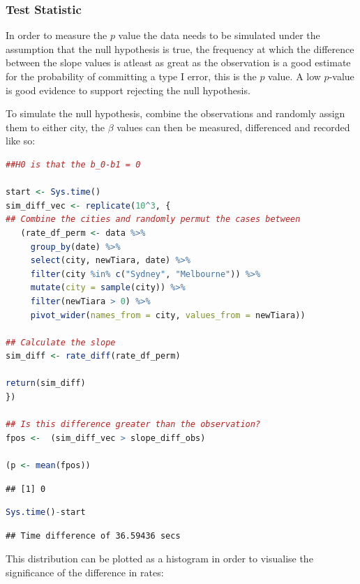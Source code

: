 \documentclass{article}
\begin{document}
\hypertarget{test-statistic-1}{%
\subsubsection{Test Statistic}\label{test-statistic-1}}

In order to measure the \(p\) value the data needs to be simulated under
the assumption that the null hypothesis is true, the frequency at which
the difference between the slope values is atleast as great as the
observation is a good estimate for the probability of committing a type
I error, this is the \(p\) value. A low \(p\)-value is good evidence to
support rejecting the null hypothesis.

To simulate the null hypothesis, combine the observations and randomly
assign them to either city, the \(\beta\) values can then be measured,
differenced and recorded like so:

\begin{lstlisting}[language=R]
##H0 is that the b_0-b1 = 0

start <- Sys.time()
sim_diff_vec <- replicate(10^3, {
## Combine the cities and randomly permut the cases between
   (rate_df_perm <- data %>% 
     group_by(date) %>% 
     select(city, newTiara, date) %>% 
     filter(city %in% c("Sydney", "Melbourne")) %>% 
     mutate(city = sample(city)) %>% 
     filter(newTiara > 0) %>% 
     pivot_wider(names_from = city, values_from = newTiara))
  
## Calculate the slope
sim_diff <- rate_diff(rate_df_perm)

return(sim_diff)
}) 

## Is this difference greater than the observation?
fpos <-  (sim_diff_vec > slope_diff_obs)

(p <- mean(fpos))
\end{lstlisting}

\begin{lstlisting}
## [1] 0
\end{lstlisting}

\begin{lstlisting}[language=R]
Sys.time()-start
\end{lstlisting}

\begin{lstlisting}
## Time difference of 36.59436 secs
\end{lstlisting}

This distribution can be plotted as a histogram in order to visualise
the significance of the difference in rates:
\end{document}
